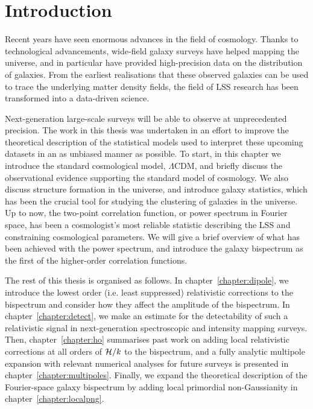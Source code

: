 
\chapter{Introduction}
\label{chapter:introgen}

Recent years have seen enormous advances in the field of cosmology. Thanks to technological advancements, wide-field galaxy surveys have helped mapping the universe, and in particular have provided high-precision data on the distribution of galaxies. From the earliest realisations that these observed galaxies can be used to trace the underlying matter density fields, the field of LSS research has been transformed into a data-driven science. 

Next-generation large-scale surveys will be able to observe at unprecedented precision. The work in this thesis was undertaken in an effort to improve the theoretical description of the statistical models used to interpret these upcoming datasets in an as unbiased manner as possible. To start, in this chapter we introduce the standard cosmological model, $\Lambda$CDM, and briefly discuss the observational evidence supporting the standard model of cosmology. We also discuss structure formation in the universe, and introduce galaxy statistics, which has been the crucial tool for studying the clustering of galaxies in the universe. Up to now, the two-point correlation function, or power spectrum in Fourier space, has been a cosmologist's most reliable statistic describing the LSS and constraining cosmological parameters. We will give a brief overview of what has been achieved with the power spectrum, and introduce the galaxy bispectrum as the first of the higher-order correlation functions. 

The rest of this thesis is organised as follows. In chapter~\ref{chapter:dipole}, we introduce the lowest order (i.e. least suppressed) relativistic corrections to the bispectrum and consider how they affect the amplitude of the bispectrum. In chapter~\ref{chapter:detect}, we make an estimate for the detectability of such a relativistic signal in next-generation spectroscopic and intensity mapping surveys. Then, chapter~\ref{chapter:ho} summarises past work on adding local relativistic corrections at all orders of $\mathcal{H}/k$ to the bispectrum, and a fully analytic multipole expansion with relevant numerical analyses for future surveys is presented in chapter~\ref{chapter:multipoles}. Finally, we expand the theoretical description of the Fourier-space galaxy bispectrum by adding local primordial non-Gaussianity in chapter~\ref{chapter:localpng}.

